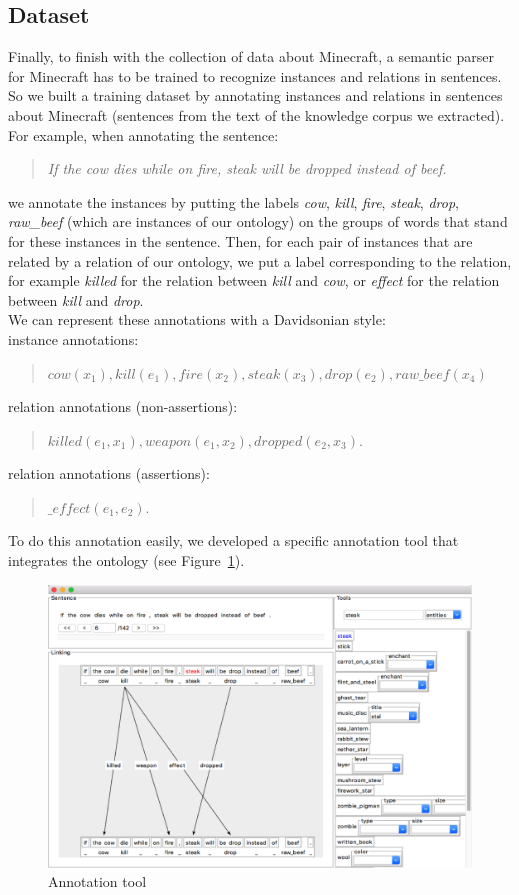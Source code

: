 \documentclass[12pt]{article}
\begin{document}
\subsection{Dataset}
Finally, to finish with the collection of data about Minecraft, a semantic parser for Minecraft has to be trained to recognize instances and relations in sentences. So we built a training dataset by annotating instances and relations in sentences about Minecraft (sentences from the text of the knowledge corpus we extracted).
For example, when annotating the sentence:
\begin{quote}
\textit{If the cow dies while on fire, steak will be dropped instead of beef.}
\end{quote}
we annotate the instances by putting the labels \textit{cow}, \textit{kill}, \textit{fire}, \textit{steak}, \textit{drop}, \textit{raw\_beef} (which are instances of our ontology) on the groups of words that stand for these instances in the sentence. Then, for each pair of instances that are related by a relation of our ontology, we put a label corresponding to the relation, for example \textit{killed} for the relation between \textit{kill} and \textit{cow}, or \textit{effect} for the relation between \textit{kill} and \textit{drop}.\\
We can represent these annotations with a Davidsonian style:\\
instance annotations:
\begin{quote}
\centering $cow(x_1), kill(e_1), fire(x_2), steak(x_3), drop(e_2), raw\_beef(x_4)$
\end{quote}
relation annotations (non-assertions): 
\begin{quote}
\centering $killed(e_1, x_1), weapon(e_1, x_2), dropped(e_2, x_3)$.
\end{quote}
relation annotations (assertions):
\begin{quote}
\centering $\_effect(e_1, e_2)$.
\end{quote}
To do this annotation easily, we developed a specific annotation tool that integrates the ontology (see Figure~\ref{annot_tool}).
\begin{figure}[!ht]
   \centering \includegraphics[width=\linewidth]{Figures/Knowledge/annot_tool.png}
   \caption{\label{annot_tool} Annotation tool}
\end{figure}
\end{document}
